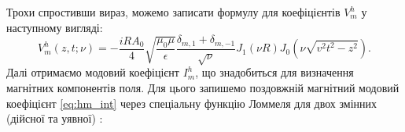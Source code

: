 Трохи спростивши вираз, можемо записати формулу для коефіцієнтів $ V_m^h $
у наступному вигляді:
%
\begin{equation} \label{eq:vmh}
V_m^h (z, t; \nu) = - \frac{iR A_0}{4} \sqrt{\frac{\mu_0 \mu}{\epsilon}} 
\frac{\delta_{m,1} + \delta_{m,-1}}{\sqrt{\nu}} J_1 (\nu R)
J_0 \left( \nu \sqrt{\mathit{v}^2 t^2 - z^2} \right).
\end{equation}
%
Далі отримаємо модовий коефіцієнт $ I_m^h $, що знадобиться для визначення
магнітних компонентів поля. Для цього запишемо поздовжній магнітний модовий
коефіцієнт \eqref{eq:hm_int} через спеціальну функцію Ломмеля для двох 
змінних (дійсної та уявної) \cite{imp:Boersma1961}:
%
%
